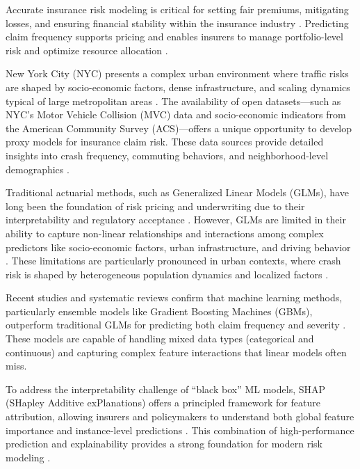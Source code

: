 \documentclass[
  number,
  review,
  3p]{elsarticle}
\begin{document}
Accurate insurance risk modeling is critical for setting fair premiums,
mitigating losses, and ensuring financial stability within the insurance
industry \citep{henckaerts, clemente}. Predicting claim frequency
supports pricing and enables insurers to manage portfolio-level risk and
optimize resource allocation \citep{mohamed}.

New York City (NYC) presents a complex urban environment where traffic
risks are shaped by socio-economic factors, dense infrastructure, and
scaling dynamics typical of large metropolitan areas
\citep{cabrera, bettencourt}. The availability of open datasets---such
as NYC's Motor Vehicle Collision (MVC) data and socio-economic
indicators from the American Community Survey (ACS)---offers a unique
opportunity to develop proxy models for insurance claim risk. These data
sources provide detailed insights into crash frequency, commuting
behaviors, and neighborhood-level demographics
\citep{adeniyi, brubacher}.

Traditional actuarial methods, such as Generalized Linear Models (GLMs),
have long been the foundation of risk pricing and underwriting due to
their interpretability and regulatory acceptance \citep{henckaerts}.
However, GLMs are limited in their ability to capture non-linear
relationships and interactions among complex predictors like
socio-economic factors, urban infrastructure, and driving behavior
\citep{clemente}. These limitations are particularly pronounced in urban
contexts, where crash risk is shaped by heterogeneous population
dynamics and localized factors \citep{cabrera, brubacher}.

Recent studies and systematic reviews confirm that machine learning
methods, particularly ensemble models like Gradient Boosting Machines
(GBMs), outperform traditional GLMs for predicting both claim frequency
and severity \citep{clemente, mohamed, behboudi}. These models are
capable of handling mixed data types (categorical and continuous) and
capturing complex feature interactions that linear models often miss.

To address the interpretability challenge of ``black box'' ML models,
SHAP (SHapley Additive exPlanations) offers a principled framework for
feature attribution, allowing insurers and policymakers to understand
both global feature importance and instance-level predictions
\citep{lundberg, dong, ning}. This combination of high-performance
prediction and explainability provides a strong foundation for modern
risk modeling \citep{kim}.
\end{document}

